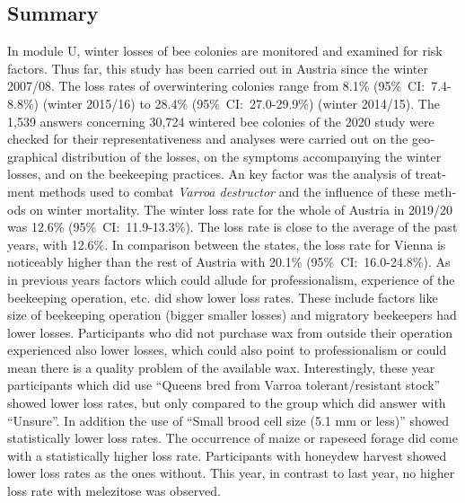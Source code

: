 \begin{otherlanguage}{english}
\section{Summary}
In module U, winter losses of bee colonies are monitored and examined for risk factors. Thus far, this study has been carried out in Austria since the winter 2007/08. The loss rates of overwintering colonies range from 8.1\% (95\%~CI:~7.4-8.8\%) (winter 2015/16) to 28.4\% (95\%~CI:~27.0-29.9\%) (winter 2014/15). 
\newline
The 1,539 answers concerning 30,724 wintered bee colonies of the 2020 study were checked for their representativeness and analyses were carried out on the geographical distribution of the losses, on the symptoms accompanying the winter losses, and on the beekeeping practices. An key factor was the analysis of treatment methods used to combat \textit{Varroa destructor} and the influence of these methods on winter mortality. 
\newline
The winter loss rate for the whole of Austria in 2019/20 was 12.6\% (95\%~CI:~11.9-13.3\%). The loss rate is close to the average of the past years, with 12.6\%. In comparison between the states, the loss rate for Vienna is noticeably higher than the rest of Austria with 20.1\% (95\%~CI:~16.0-24.8\%).
\newline
As in previous years factors which could allude for professionalism, experience of the beekeeping operation, etc. did show lower loss rates. These include factors like size of beekeeping operation (bigger smaller losses) and migratory beekeepers had lower losses. Participants who did not purchase wax from outside their operation experienced also lower losses, which could also point to professionalism or could mean there is a quality problem of the available wax.
\newline
Interestingly, these year participants which did use \enquote{Queens bred from Varroa tolerant/resistant stock} showed lower loss rates, but only compared to the group which did answer with \enquote{Unsure}. In addition the use of \enquote{Small brood cell size (5.1 mm or less)} showed statistically lower loss rates.
\newline
The occurrence of maize or rapeseed forage did come with a statistically higher loss rate. Participants with honeydew harvest showed lower loss rates as the ones without. This year, in contrast to last year, no higher loss rate with melezitose was observed.
\newline

\end{otherlanguage}
